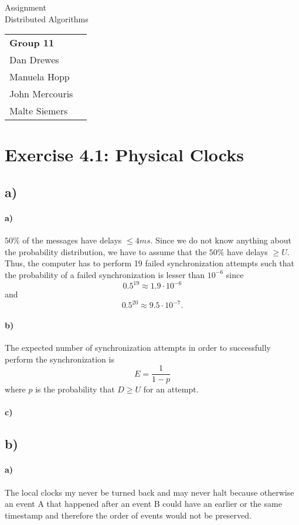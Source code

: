 \documentclass[12pt,a4paper]{article}
\begin{document}
\begin{center}
  \Large Assignment  \\
  \large Distributed Algorithms
\end{center}
\begin{flushright}
  \begin{tabular}{ll}
    \textbf{Group 11} \\
    Dan Drewes        \\ 
    Manuela Hopp      \\ 
    John Mercouris    \\
    Malte Siemers     \\
  \end{tabular} 
\end{flushright}


\section*{Exercise 4.1: Physical Clocks}
  \subsection*{a)} %
  	\paragraph{a)} $50\%$ of the messages have delays $\leq 4ms$. Since we do not know anything about the probability distribution, we have to assume that the $50\%$ have delays $\geq U$. Thus, the computer has to perform 19 failed synchronization attempts such that the probability of a failed synchronization is lesser than $10^{-6}$ since
  	\[0.5^{19} \approx 1.9 \cdot 10^{-6} \] 
  	and 
  	\[ 0.5^{20} \approx 9.5 \cdot 10^{-7} .\]
  	\paragraph{b)} The expected number of synchronization attempts in order to successfully perform the synchronization is 
  	\[ E = \frac{1}{1-p} \]
  	where $p$ is the probability that $D \geq U$ for an attempt.
  	\paragraph{c)}
  \subsection*{b)} %
    \paragraph{a)} The local clocks my never be turned back and may never halt because otherwise an event A that happened after an event B could have an earlier or the same timestamp and therefore the order of events would not be preserved.
\end{document}
